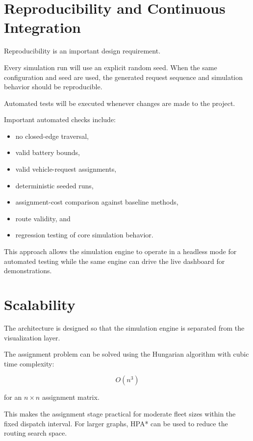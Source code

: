 \documentclass[12pt,a4paper]{article}
\begin{document}
\section{Reproducibility and Continuous Integration}

Reproducibility is an important design requirement.

Every simulation run will use an explicit random seed. When the same
configuration and seed are used, the generated request sequence and
simulation behavior should be reproducible.

Automated tests will be executed whenever changes are made to the
project.

Important automated checks include:

\begin{itemize}
    \item no closed-edge traversal,
    \item valid battery bounds,
    \item valid vehicle-request assignments,
    \item deterministic seeded runs,
    \item assignment-cost comparison against baseline methods,
    \item route validity, and
    \item regression testing of core simulation behavior.
\end{itemize}

This approach allows the simulation engine to operate in a headless
mode for automated testing while the same engine can drive the live
dashboard for demonstrations.





\section{Scalability}

The architecture is designed so that the simulation engine is
separated from the visualization layer.

The assignment problem can be solved using the Hungarian algorithm
with cubic time complexity:

\begin{equation}
    O(n^3)
    \label{eq:hungariancomplexity}
\end{equation}

for an $n\times n$ assignment matrix.

This makes the assignment stage practical for moderate fleet sizes
within the fixed dispatch interval. For larger graphs, HPA* can be
used to reduce the routing search space.
\end{document}
